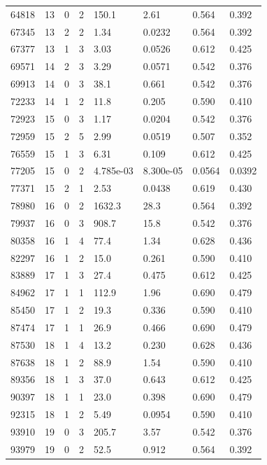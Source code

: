 \documentclass[preview]{standalone}
\begin{document}
{{{\begin{tabular}{L{1.2cm}C{1.2cm} C{0.3cm}C{0.5cm} C{1.4cm}C{1.4cm} C{1.4cm}C{1.4cm}}
  64818  &    13  & 0     &  2 &  150.1  & 2.61  & 0.564 &  0.392   \\ 
  67345  &    13  & 2     &  2 &  1.34  & 0.0232  & 0.564 &  0.392   \\ 
  67377  &    13  & 1     &  3 &  3.03  & 0.0526  & 0.612 &  0.425   \\ 
  69571  &    14  & 2     &  3 &  3.29  & 0.0571  & 0.542 &  0.376   \\ 
  69913  &    14  & 0     &  3 &  38.1  & 0.661  & 0.542 &  0.376   \\ 
  72233  &    14  & 1     &  2 &  11.8  & 0.205  & 0.590 &  0.410   \\ 
  72923  &    15  & 0     &  3 &  1.17  & 0.0204  & 0.542 &  0.376   \\ 
  72959  &    15  & 2     &  5 &  2.99  & 0.0519  & 0.507 &  0.352   \\ 
  76559  &    15  & 1     &  3 &  6.31  & 0.109  & 0.612 &  0.425   \\ 
  77205  &    15  & 0     &  2 &  4.785e-03  & 8.300e-05  & 0.0564 &  0.0392   \\ 
  77371  &    15  & 2     &  1 &  2.53  & 0.0438  & 0.619 &  0.430   \\ 
  78980  &    16  & 0     &  2 &  1632.3  & 28.3  & 0.564 &  0.392   \\ 
  79937  &    16  & 0     &  3 &  908.7  & 15.8  & 0.542 &  0.376   \\ 
  80358  &    16  & 1     &  4 &  77.4  & 1.34  & 0.628 &  0.436   \\ 
  82297  &    16  & 1     &  2 &  15.0  & 0.261  & 0.590 &  0.410   \\ 
  83889  &    17  & 1     &  3 &  27.4  & 0.475  & 0.612 &  0.425   \\ 
  84962  &    17  & 1     &  1 &  112.9  & 1.96  & 0.690 &  0.479   \\ 
  85450  &    17  & 1     &  2 &  19.3  & 0.336  & 0.590 &  0.410   \\ 
  87474  &    17  & 1     &  1 &  26.9  & 0.466  & 0.690 &  0.479   \\ 
  87530  &    18  & 1     &  4 &  13.2  & 0.230  & 0.628 &  0.436   \\ 
  87638  &    18  & 1     &  2 &  88.9  & 1.54  & 0.590 &  0.410   \\ 
  89356  &    18  & 1     &  3 &  37.0  & 0.643  & 0.612 &  0.425   \\ 
  90397  &    18  & 1     &  1 &  23.0  & 0.398  & 0.690 &  0.479   \\ 
  92315  &    18  & 1     &  2 &  5.49  & 0.0954  & 0.590 &  0.410   \\ 
  93910  &    19  & 0     &  3 &  205.7  & 3.57  & 0.542 &  0.376   \\ 
  93979  &    19  & 0     &  2 &  52.5  & 0.912  & 0.564 &  0.392   \\ 
\hline 
\end{tabular} 

}}}
\end{document}

